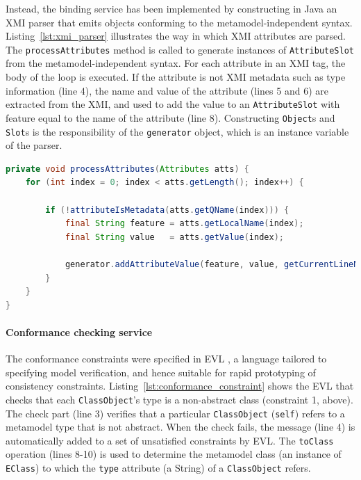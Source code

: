 Instead, the binding service has been implemented by constructing in Java an XMI parser that emits objects conforming to the metamodel-independent syntax. Listing~\ref{lst:xmi_parser} illustrates the way in which XMI attributes are parsed. The \texttt{pr\-oc\-e\-ssAtt\-rib\-ut\-es} method is called to generate instances of \texttt{At\-tr\-ibu\-teSl\-ot} from the metamodel-independent syntax. For each attribute in an XMI tag, the body of the loop is executed. If the attribute is not XMI metadata such as type information (line 4), the name and value of the attribute (lines 5 and 6) are extracted from the XMI, and used to add the value to an \texttt{At\-tr\-ibu\-teSl\-ot} with feature equal to the name of the attribute (line 8). Constructing \texttt{O\-bj\-e\-ct}s and \texttt{Sl\-ot}s is the responsibility of the \texttt{ge\-ne\-ra\-tor} object, which is an instance variable of the parser.


\begin{lstlisting}[caption=Parsing XMI attributes (in Java), label=lst:xmi_parser, language=Java]
private void processAttributes(Attributes atts) {
	for (int index = 0; index < atts.getLength(); index++) {
		
		if (!attributeIsMetadata(atts.getQName(index))) {
			final String feature = atts.getLocalName(index);
			final String value   = atts.getValue(index);
			
			generator.addAttributeValue(feature, value, getCurrentLineNumber());
		}
	}
}
\end{lstlisting}

\paragraph{Conformance checking service} The conformance constraints were specified in EVL \cite{kolovos08evl}, a language tailored to specifying model verification, and hence suitable for rapid prototyping of consistency constraints. Listing~\ref{lst:conformance_constraint} shows the EVL that checks that each \texttt{ClassObject}'s type is a non-abstract class (constraint 1, above). The check part (line 3) verifies that a particular \texttt{ClassObject} (\texttt{self}) refers to a metamodel type that is not abstract. When the check fails, the message (line 4) is automatically added to a set of unsatisfied constraints by EVL. The \texttt{toClass} operation (lines 8-10) is used to determine the metamodel class (an instance of \texttt{EClass}) to which the \texttt{type} attribute (a String) of a \texttt{ClassObject} refers.

